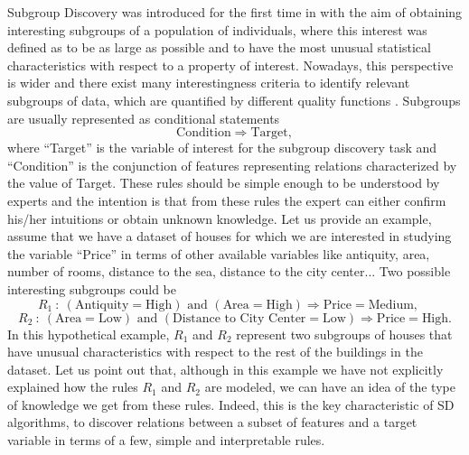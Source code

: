 Subgroup Discovery was introduced for the first time in \cite{Klosgen1996,Wrobel1997} with the aim of obtaining interesting subgroups of a population of individuals, where this interest was defined as to be as large as possible and to have the most unusual statistical characteristics with respect to a property of interest.  Nowadays, this perspective is wider and there exist many interestingness criteria to identify relevant subgroups of data, which are quantified by different quality functions \cite{Atzmueller2015}. Subgroups are usually represented as conditional statements
$$\text{Condition} \Rightarrow \text{Target},$$
where ``Target'' is the variable of interest for the subgroup discovery task and ``Condition'' is the conjunction of features representing relations characterized by the value of Target. These rules should be simple enough to be understood by experts and the intention is that from these rules the expert can either confirm his/her intuitions or obtain unknown knowledge. Let us provide an example, assume that we have a dataset of houses for which we are interested in studying the variable ``Price'' in terms of other available variables like antiquity, area, number of rooms, distance to the sea, distance to the city center... Two possible interesting subgroups could be
$$R_1~:~(\text{Antiquity} = \text{High}) \text{ and } (\text{Area} = \text{High}) \Rightarrow \text{Price} = \text{Medium}, \quad$$
$$R_2~:~(\text{Area} = \text{Low}) \text{ and } (\text{Distance to City Center} = \text{Low}) \Rightarrow \text{Price} = \text{High}.$$
In this hypothetical example, $R_1$ and $R_2$ represent two subgroups of houses that have unusual characteristics with respect to the rest of the buildings in the dataset. Let us point out that, although in this example we have not explicitly explained how the rules $R_1$ and $R_2$ are modeled, we can have an idea of the type of knowledge we get from these rules. Indeed, this is the key characteristic of SD algorithms, to discover relations between a subset of features and a target variable in terms of a few, simple and interpretable rules.

